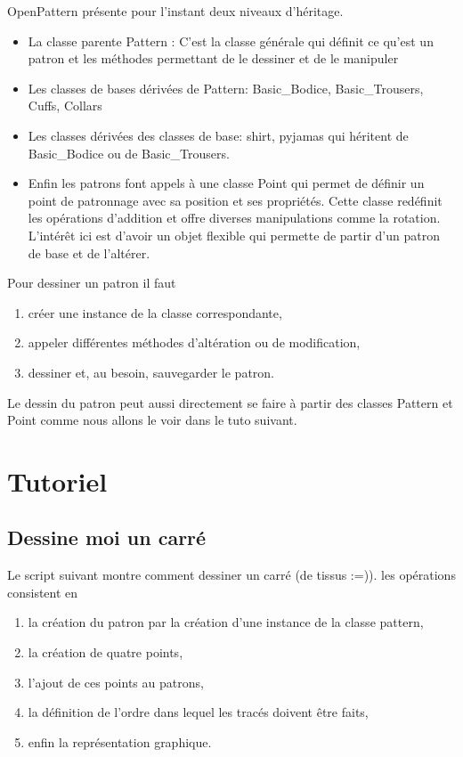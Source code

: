 \documentclass[10pt,a4paper,twoside]{report}
\begin{document}
OpenPattern présente pour l'instant deux niveaux d'héritage.
\begin{itemize}
\item La classe parente Pattern : C'est la classe générale qui définit ce qu'est un patron et les méthodes permettant de le dessiner et de le manipuler
\item Les classes de bases dérivées de Pattern: Basic\_Bodice, Basic\_Trousers, Cuffs, Collars
\item Les classes dérivées des classes de base: shirt, pyjamas qui héritent de Basic\_Bodice ou de Basic\_Trousers. \item Enfin les patrons font appels à une classe Point qui permet de définir un point de patronnage avec sa position et ses propriétés. Cette classe redéfinit les opérations d'addition et offre diverses manipulations  comme la rotation. L'intérêt ici est d'avoir un objet flexible qui permette de partir d'un patron de base et de l'altérer.
\end{itemize}

Pour dessiner un patron il faut
\begin{enumerate}
\item créer une instance de la classe correspondante,
\item appeler différentes méthodes d'altération ou de modification,
\item dessiner et, au besoin, sauvegarder le patron.
\end{enumerate}

Le dessin du patron peut aussi  directement se faire à partir des classes Pattern et Point comme nous allons le voir dans le tuto suivant.

\chapter{Tutoriel}


\section{Dessine moi un carré}

Le script suivant montre comment dessiner un carré (de tissus :=)).
les opérations consistent en
\begin{enumerate}
  \item la création du patron par la création d'une instance de la classe pattern,
  \item la création de quatre points,
  \item l'ajout de ces points au patrons,
  \item la définition de l'ordre dans lequel les tracés doivent être faits,
  \item enfin la représentation graphique.
\end{enumerate}
\end{document}
